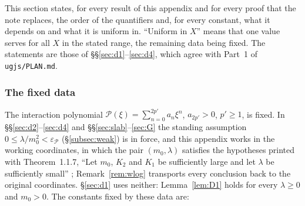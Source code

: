 \documentclass[11pt,a4paper]{article}
\theoremstyle{plain}
\theoremstyle{definition}
\theoremstyle{plain}
\theoremstyle{definition}
\begin{document}
This section states, for every result of this appendix and for every proof that the
note replaces, the order of the quantifiers and, for every constant, what it depends on and
what it is uniform in. ``Uniform in $X$'' means that one value serves for all $X$ in the stated
range, the remaining data being fixed. The statements are those of
\S\S\ref{sec:d1}--\ref{sec:d4}, which agree with Part~1 of \texttt{ugjs/PLAN.md}.

\subsubsection{The fixed data}\label{sec:quant-fixed}

The interaction polynomial $\mathscr P(\xi)=\sum_{n=0}^{2p'}a_n\xi^n$, $a_{2p'}>0$,
$p'\ge1$, is fixed. In \S\S\ref{sec:d2}--\ref{sec:d4} and \S\S\ref{sec:slab}--\ref{sec:G} the standing
assumption $0\le\lambda/m_0^2<\varepsilon_{\mathscr P}$ (\S\ref{subsec:weak}) is in force, and this appendix works in the working coordinates, in which the
pair $(m_0,\lambda)$ satisfies the hypotheses printed with Theorem~1.1.7, ``Let $m_0$, $K_2$
and $K_1$ be sufficiently large and let $\lambda$ be sufficiently small'' \cite[p.~594]{GJS};
Remark~\ref{rem:wlog} transports every conclusion back to the original
coordinates. \S\ref{sec:d1} uses neither: Lemma~\ref{lem:D1} holds for every $\lambda\ge0$ and
$m_0>0$. The constants fixed by these data are:
\end{document}
